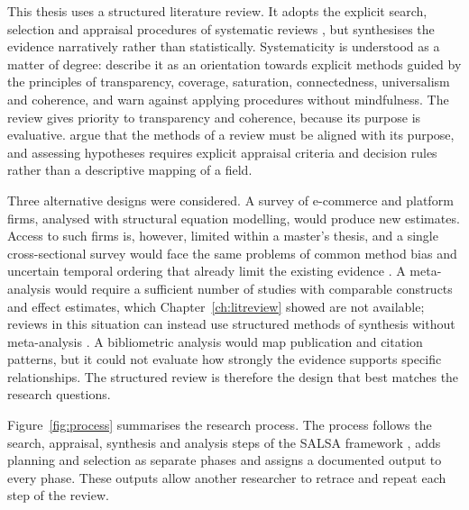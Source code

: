 This thesis uses a structured literature review. It adopts the explicit search, selection and appraisal procedures of systematic reviews \parencite{tranfield2003, paul2021}, but synthesises the evidence narratively rather than statistically. Systematicity is understood as a matter of degree: \textcite{simsek2023} describe it as an orientation towards explicit methods guided by the principles of transparency, coverage, saturation, connectedness, universalism and coherence, and warn against applying procedures without mindfulness. The review gives priority to transparency and coherence, because its purpose is evaluative. \textcite{kunisch2023} argue that the methods of a review must be aligned with its purpose, and assessing hypotheses requires explicit appraisal criteria and decision rules rather than a descriptive mapping of a field.

Three alternative designs were considered. A survey of e-commerce and platform firms, analysed with structural equation modelling, would produce new estimates. Access to such firms is, however, limited within a master's thesis, and a single cross-sectional survey would face the same problems of common method bias and uncertain temporal ordering that already limit the existing evidence \parencite{podsakoff2024, rohrer2022}. A meta-analysis would require a sufficient number of studies with comparable constructs and effect estimates, which Chapter~\ref{ch:litreview} showed are not available; reviews in this situation can instead use structured methods of synthesis without meta-analysis \parencite{campbell2020}. A bibliometric analysis would map publication and citation patterns, but it could not evaluate how strongly the evidence supports specific relationships. The structured review is therefore the design that best matches the research questions.

Figure~\ref{fig:process} summarises the research process. The process follows the search, appraisal, synthesis and analysis steps of the SALSA framework \parencite{grant2009}, adds planning and selection as separate phases and assigns a documented output to every phase. These outputs allow another researcher to retrace and repeat each step of the review.

